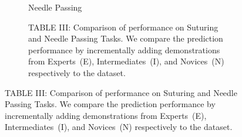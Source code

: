 \begin{figure}[!ht]
\begin{subfigure}[t]{0.5\textwidth}
		\caption{Needle Passing}
		\label{fig:needlePassing}
		\par\vspace{0pt}
	\end{subfigure}
	\quad
	\begin{subfigure}[t]{0.4\textwidth}
            \vspace{0pt}
            \centering
            \caption{TABLE III: Comparison of \TSC performance on Suturing and Needle Passing Tasks. We compare the prediction performance by incrementally adding demonstrations from Experts~(E), Intermediates~(I), and Novices~(N) respectively to the dataset.}
            \label{tab:jigsaws}
            \par\vspace{0pt}
	\end{subfigure}

\end{figure}
